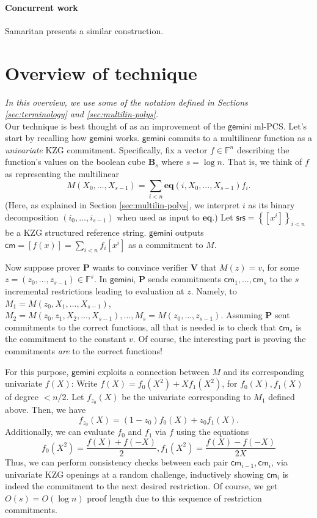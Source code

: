 \documentclass[11pt]{article} %
\newcommand{\gemini}{\ensuremath{\mathsf{gemini}}\xspace}
\newcommand{\F}{\ensuremath{\mathbb F}\xspace}
\newcommand{\srs}{\ensuremath{\mathsf{srs}}\xspace}
\newcommand{\cm}{\ensuremath{\mathsf{cm}}\xspace}
\newcommand{\sett}[2]{\ensuremath{\set{#1}_{#2}}\xspace}
\newcommand{\enc}[1]{\ensuremath{\left[#1\right]}\xspace}
\newcommand{\prv}{\ensuremath{\mathsf{\mathbf{P}}}\xspace}
\newcommand{\ver}{\ensuremath{\mathsf{\mathbf{V}}}\xspace}
\newcommand{\set}[1]{\ensuremath{\left\{#1\right\}}\xspace}
\newcommand{\sumi}[1]{\sum_{i< #1}}
\newtheorem{remark}[lemma]{Remark}
\newcommand{\eq}{\ensuremath{\mathsf{eq}}\xspace}
\renewcommand{\eq}{\ensuremath{\mathbf{eq}}\xspace}
\newcommand{\B}[1]{\ensuremath{\mathbf{B}_{#1}}\xspace}
\newcommand{\mlpcs}{ml-PCS\xspace}
\begin{document}
\paragraph{Concurrent work}
Samaritan\cite{samaritan} presents a similar construction.

\section{Overview of technique}
 \textit{In this overview, we use some of the notation defined in Sections \ref{sec:terminology} and \ref{sec:multilin-polys}.} \\ 

Our technique is best thought of as an improvement of the \gemini \mlpcs\cite{gemini}.
Let's start by recalling how \gemini works.
\gemini commits to a multilinear function as a \emph{univariate} KZG commitment\cite{kzg}. Specifically,
fix a vector $f\in \F^n$ describing the function's values on the boolean cube \B{s} where $s=\log n$. That is, we think of $f$ as representing the 
multilinear
\[M(X_0,\ldots,X_{s-1})= \sumi{n}\eq(i,X_0,\ldots,X_{s-1}) f_i.\]
(Here, as explained in Section \ref{sec:multilin-polys}, we interpret $i$ as its binary decomposition $(i_0,\ldots,i_{s-1})$
when used as input to \eq.)
Let $\srs =\sett{\enc{x^i}}{i<n}$be a KZG structured reference string.
 \gemini outputs $\cm=\enc{f(x)}=\sumi{n}f_i \enc{x^i}$ as a commitment to $M$.  


Now suppose prover \prv wants to convince verifier \ver  that $M(z)=v$, for some $z=(z_0,\ldots,z_{s-1})\in \F^s$. In \gemini, \prv sends commitments $\cm_1,\ldots,\cm_s$ to the $s$ incremental restrictions leading  to evaluation at $z$.
Namely, to $M_1=M(z_0,X_1,\ldots,X_{s-1})$, $M_2=M(z_0,z_1,X_2,\ldots,X_{s-1}),\ldots,M_s=M(z_0,\ldots,z_{s-1})$.
Assuming \prv sent commitments to the correct functions, all that is needed is to check that $\cm_s$ is the commitment to the constant $v$. Of course, the interesting part is proving the commitments \emph{are} to the correct functions!

For this purpose, \gemini exploits a connection between $M$ and its corresponding univariate $f(X)$:
Write $f(X)=f_0(X^2)+X f_1(X^2)$, for $f_0(X),f_1(X)$ of degree $<n/2$. Let $f_{z_0}(X)$ be the univariate corresponding to $M_1$ defined above. Then, we have
\[f_{z_0}(X)=(1-z_0)f_0(X)+ z_0 f_1(X).\]
Additionally, we can evaluate $f_0$ and $f_1$ via $f$  using the equations
\[f_0(X^2)=\frac{f(X)+f(-X)}{2}, f_1(X^2)=\frac{f(X)-f(-X)}{2X}\]
Thus, we can perform consistency checks between each pair $\cm_{i-1},\cm_i$, via univariate KZG openings at a random challenge, inductively showing $\cm_i$ is indeed the commitment to the next desired restriction.
Of course, we get $O(s)=O(\log n)$ proof length due to this sequence of restriction commitments.
\end{document}
